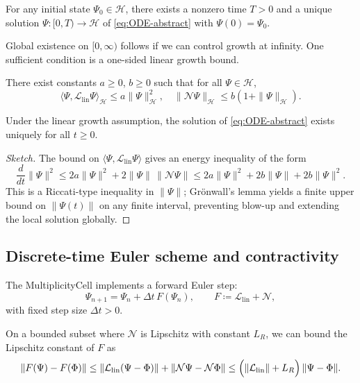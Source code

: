 \documentclass[11pt]{article}
\begin{document}
\begin{theorem}
For any initial state \(\Psi_0\in\mathcal{H}\), there exists a nonzero time \(T>0\) and a unique solution \(\Psi:[0,T)\to \mathcal{H}\) of \eqref{eq:ODE-abstract} with \(\Psi(0)=\Psi_0\).
\end{theorem}

Global existence on \([0,\infty)\) follows if we can control growth at infinity. One sufficient condition is a one-sided linear growth bound.

\begin{assumption}
There exist constants \(a\ge 0\), \(b\ge 0\) such that for all \(\Psi\in\mathcal{H}\),
\[
\langle \Psi, \mathcal{L}_{\mathrm{lin}}\Psi\rangle_{\mathcal{H}} \le a\|\Psi\|_{\mathcal{H}}^2,
\quad
\|\mathcal{N}\Psi\|_{\mathcal{H}}\le b(1+\|\Psi\|_{\mathcal{H}}).
\]
\end{assumption}

\begin{theorem}
Under the linear growth assumption, the solution of \eqref{eq:ODE-abstract} exists uniquely for all \(t\ge 0\).
\end{theorem}

\begin{proof}[Sketch]
The bound on \(\langle \Psi,\mathcal{L}_{\mathrm{lin}}\Psi\rangle\) gives an energy inequality of the form
\[
\frac{d}{dt}\|\Psi\|^2 \le 2a \|\Psi\|^2 + 2\|\Psi\|\,\|\mathcal{N}\Psi\|
\le 2a\|\Psi\|^2 + 2b\|\Psi\| + 2b\|\Psi\|^2.
\]
This is a Riccati-type inequality in \(\|\Psi\|\); Grönwall’s lemma yields a finite upper bound on \(\|\Psi(t)\|\) on any finite interval, preventing blow-up and extending the local solution globally.
\end{proof}

\subsection{Discrete-time Euler scheme and contractivity}

The MultiplicityCell implements a forward Euler step:
\begin{equation}
\Psi_{n+1} = \Psi_n + \Delta t\,F(\Psi_n),
\qquad F \coloneqq \mathcal{L}_{\mathrm{lin}} + \mathcal{N},
\label{eq:Euler-step}
\end{equation}
with fixed step size \(\Delta t>0\).

On a bounded subset where \(\mathcal{N}\) is Lipschitz with constant \(L_R\), we can bound the Lipschitz constant of \(F\) as
\[
\|F(\Psi)-F(\Phi)\|
\le
\|\mathcal{L}_{\mathrm{lin}}(\Psi-\Phi)\| + \|\mathcal{N}\Psi - \mathcal{N}\Phi\|
\le
\Bigl(\|\mathcal{L}_{\mathrm{lin}}\| + L_R\Bigr)\,\|\Psi-\Phi\|.
\]
\end{document}
